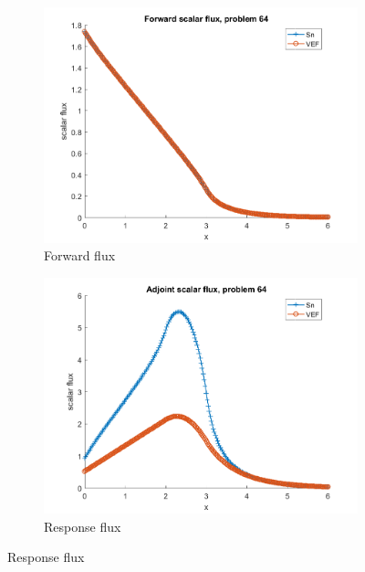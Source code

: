 \documentclass{article}
\begin{document}
\begin{figure}[H]
\label{Case64Flux}
\centering
\begin{subfigure}{.5\textwidth}
  \centering
  \includegraphics[width=.98\linewidth]{IanProposal/figures2/64phi.png}
  \caption{Forward flux}
  \label{fig:sfig1}
\end{subfigure}%
\begin{subfigure}{.5\textwidth}
  \centering
  \includegraphics[width=.98\linewidth]{IanProposal/figures2/64phia.png}
  \caption{Response flux}
  \label{fig:sfig4}
\end{subfigure}%
\end{figure}
\end{document}

